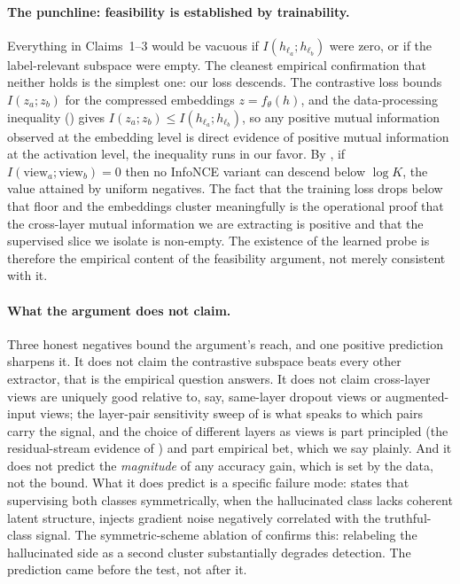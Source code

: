 \paragraph{The punchline: feasibility is established by trainability.}
Everything in Claims~1--3 would be vacuous if $I(h_{\ell_a}; h_{\ell_b})$ were
zero, or if the label-relevant subspace were empty. The cleanest empirical
confirmation that neither holds is the simplest one: our loss descends. The
contrastive loss bounds $I(z_a; z_b)$ for the compressed embeddings
$z = f_\theta(h)$, and the data-processing inequality () gives
$I(z_a; z_b) \le I(h_{\ell_a}; h_{\ell_b})$, so any positive mutual information
observed at the embedding level is direct evidence of positive mutual information
at the activation level, the inequality runs in our favor. By
, if $I(\mathrm{view}_a; \mathrm{view}_b) = 0$ then no
InfoNCE variant can descend below $\log K$, the value attained by uniform
negatives. The fact that the training loss drops below that floor and the
embeddings cluster meaningfully is the operational proof that the cross-layer
mutual information we are extracting is positive and that the supervised slice we
isolate is non-empty. The existence of the learned probe is therefore the
empirical content of the feasibility argument, not merely consistent with it.

\paragraph{What the argument does not claim.}
Three honest negatives bound the argument's reach, and one positive prediction
sharpens it. It does not claim the contrastive subspace beats every other
extractor, that is the empirical question  answers. It does
not claim cross-layer views are uniquely good relative to, say, same-layer
dropout views or augmented-input views; the layer-pair sensitivity sweep of
 is what speaks to which pairs carry the signal, and the
choice of different layers as views is part principled (the residual-stream
evidence of ) and part empirical bet, which we say
plainly. And it does not predict the \emph{magnitude} of any accuracy gain, which
is set by the data, not the bound. What it does predict is a specific failure
mode:  states that supervising both classes symmetrically,
when the hallucinated class lacks coherent latent structure, injects gradient
noise negatively correlated with the truthful-class signal. The symmetric-scheme
ablation of  confirms this: relabeling the hallucinated side
as a second cluster substantially degrades detection. The prediction came before
the test, not after it.

